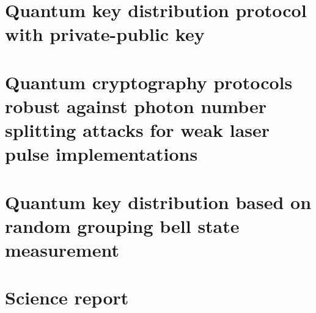 \section{Quantum key distribution protocol with private-public key}
\blindtext
\subsection*{\trnas}
\blindtext
\subsection*{\review}
\blindtext
\subsection*{\dic}
\blindtext
\section{Quantum cryptography protocols robust against photon number splitting attacks for weak laser pulse implementations}
\blindtext
\subsection*{\trnas}
\blindtext
\subsection*{\review}
\blindtext
\subsection*{\dic}
\blindtext
\section{Quantum key distribution based on random grouping bell state measurement}
\blindtext
\subsection*{\trnas}
\blindtext
\subsection*{\review}
\blindtext
\subsection*{\dic}
\blindtext
\section{Science report}
\blindtext
\clearpage

